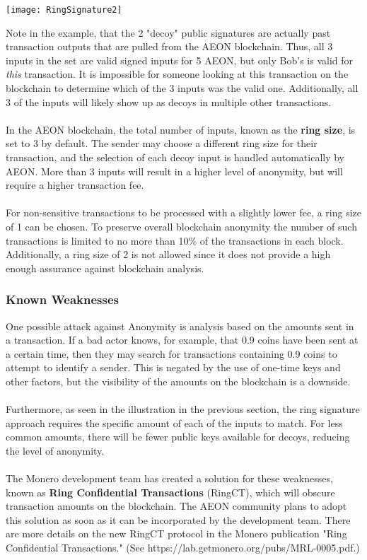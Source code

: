 \begin{center}
	\texttt{[image: RingSignature2]}
\end{center}
Note in the example, that the 2 "decoy" public signatures are actually past transaction outputs that are pulled from the AEON blockchain. Thus, all 3 inputs in the set are valid signed inputs for 5 AEON, but only Bob's is valid for \textit{this} transaction.  It is impossible for someone looking at this transaction on the blockchain to determine which of the 3 inputs was the valid one.  Additionally, all 3 of the inputs will likely show up as decoys in multiple other transactions.\\
\\
In the AEON blockchain, the total number of inputs, known as the \textbf{ring size}, is set to 3 by default. The sender may choose a different ring size for their transaction, and the selection of each decoy input is handled automatically by AEON. More than 3 inputs will result in a higher level of anonymity, but will require a higher transaction fee.\\
\\
For non-sensitive transactions to be processed with a slightly lower fee, a ring size of 1 can be chosen.  To preserve overall blockchain anonymity the number of such transactions is limited to no more than 10\% of the transactions in each block.  Additionally, a ring size of 2 is not allowed since it does not provide a high enough assurance against blockchain analysis.

\subsubsection{Known Weaknesses}
One possible attack against Anonymity is analysis based on the amounts sent in a transaction. If a bad actor knows, for example, that 0.9 coins have been sent at a certain time, then they may search for transactions containing 0.9 coins to attempt to identify a sender.  This is negated by the use of one-time keys and other factors, but the visibility of the amounts on the blockchain is a downside.\\
\\
Furthermore, as seen in the illustration in the previous section, the ring signature approach requires the specific amount of each of the inputs to match.  For less common amounts, there will be fewer public keys available for decoys, reducing the level of anonymity.\\
\\
The Monero development team has created a solution for these weaknesses, known as \textbf{Ring Confidential Transactions} (RingCT), which will obscure transaction amounts on the blockchain.  The AEON community plans to adopt this solution as soon as it can be incorporated by the development team.  There are more details on the new RingCT protocol in the Monero publication "Ring Confidential Transactions." (See https://lab.getmonero.org/pubs/MRL-0005.pdf.)

